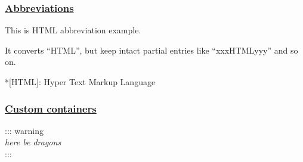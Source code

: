 \documentclass[]{article}
\begin{document}
\subsubsection{\texorpdfstring{\href{https://github.com/markdown-it/markdown-it-abbr}{Abbreviations}}{Abbreviations}}\label{abbreviations}

This is HTML abbreviation example.

It converts ``HTML'', but keep intact partial entries like
``xxxHTMLyyy'' and so on.

*{[}HTML{]}: Hyper Text Markup Language

\subsubsection{\texorpdfstring{\href{https://github.com/markdown-it/markdown-it-container}{Custom
containers}}{Custom containers}}\label{custom-containers}

::: warning\\
\emph{here be dragons}\\
:::
\end{document}
